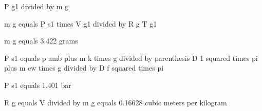 P g1 divided by m g

m g equals P s1 times V g1 divided by R g T g1

m g equals 3.422 grams

P s1 equals p amb plus m k times g divided by parenthesis D 1 squared times pi plus m ew times g divided by D f squared times pi

P s1 equals 1.401 bar

R g equals V divided by m g equals 0.16628 cubic meters per kilogram
